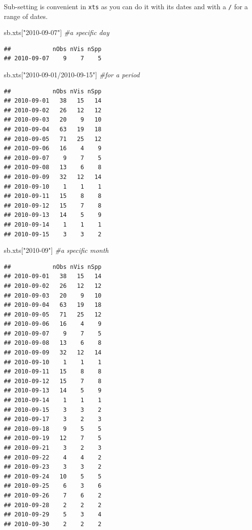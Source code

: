 \documentclass[
  10pt,
]{article}
\newenvironment{Shaded}{\begin{snugshade}}{\end{snugshade}}
\newcommand{\CommentTok}[1]{\textcolor[rgb]{0.56,0.35,0.01}{\textit{#1}}}
\newcommand{\NormalTok}[1]{#1}
\newcommand{\StringTok}[1]{\textcolor[rgb]{0.31,0.60,0.02}{#1}}
\begin{document}
Sub-setting is convenient in \texttt{xts} as you can do it with its dates and with a \texttt{/} for a range of dates.

\begin{Shaded}
\begin{Highlighting}[]
\NormalTok{sb.xts[}\StringTok{"2010{-}09{-}07"}\NormalTok{] }\CommentTok{\#a specific day}
\end{Highlighting}
\end{Shaded}

\begin{verbatim}
##            nObs nVis nSpp
## 2010-09-07    9    7    5
\end{verbatim}

\begin{Shaded}
\begin{Highlighting}[]
\NormalTok{sb.xts[}\StringTok{"2010{-}09{-}01/2010{-}09{-}15"}\NormalTok{] }\CommentTok{\#for a period}
\end{Highlighting}
\end{Shaded}

\begin{verbatim}
##            nObs nVis nSpp
## 2010-09-01   38   15   14
## 2010-09-02   26   12   12
## 2010-09-03   20    9   10
## 2010-09-04   63   19   18
## 2010-09-05   71   25   12
## 2010-09-06   16    4    9
## 2010-09-07    9    7    5
## 2010-09-08   13    6    8
## 2010-09-09   32   12   14
## 2010-09-10    1    1    1
## 2010-09-11   15    8    8
## 2010-09-12   15    7    8
## 2010-09-13   14    5    9
## 2010-09-14    1    1    1
## 2010-09-15    3    3    2
\end{verbatim}

\begin{Shaded}
\begin{Highlighting}[]
\NormalTok{sb.xts[}\StringTok{"2010{-}09"}\NormalTok{] }\CommentTok{\#a specific month}
\end{Highlighting}
\end{Shaded}

\begin{verbatim}
##            nObs nVis nSpp
## 2010-09-01   38   15   14
## 2010-09-02   26   12   12
## 2010-09-03   20    9   10
## 2010-09-04   63   19   18
## 2010-09-05   71   25   12
## 2010-09-06   16    4    9
## 2010-09-07    9    7    5
## 2010-09-08   13    6    8
## 2010-09-09   32   12   14
## 2010-09-10    1    1    1
## 2010-09-11   15    8    8
## 2010-09-12   15    7    8
## 2010-09-13   14    5    9
## 2010-09-14    1    1    1
## 2010-09-15    3    3    2
## 2010-09-17    3    2    3
## 2010-09-18    9    5    5
## 2010-09-19   12    7    5
## 2010-09-21    3    2    3
## 2010-09-22    4    4    2
## 2010-09-23    3    3    2
## 2010-09-24   10    5    5
## 2010-09-25    6    3    6
## 2010-09-26    7    6    2
## 2010-09-28    2    2    2
## 2010-09-29    5    3    4
## 2010-09-30    2    2    2
\end{verbatim}
\end{document}
